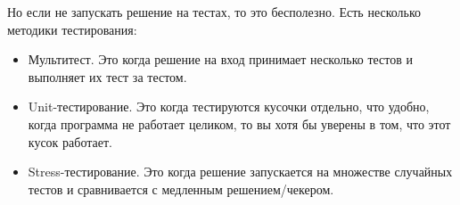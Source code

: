 Но если не запускать решение на тестах, то это бесполезно.
Есть несколько методики тестирования:
\begin{itemize}
    \item Мультитест. Это когда решение на вход принимает несколько тестов и выполняет их тест за тестом. 
    \item Unit-тестирование. Это когда тестируются кусочки отдельно, что удобно, когда программа не работает целиком, то вы хотя бы уверены в том, что этот кусок работает.
    \item Stress-тестирование. Это когда решение запускается на множестве случайных тестов и сравнивается с медленным решением/чекером.
\end{itemize}


